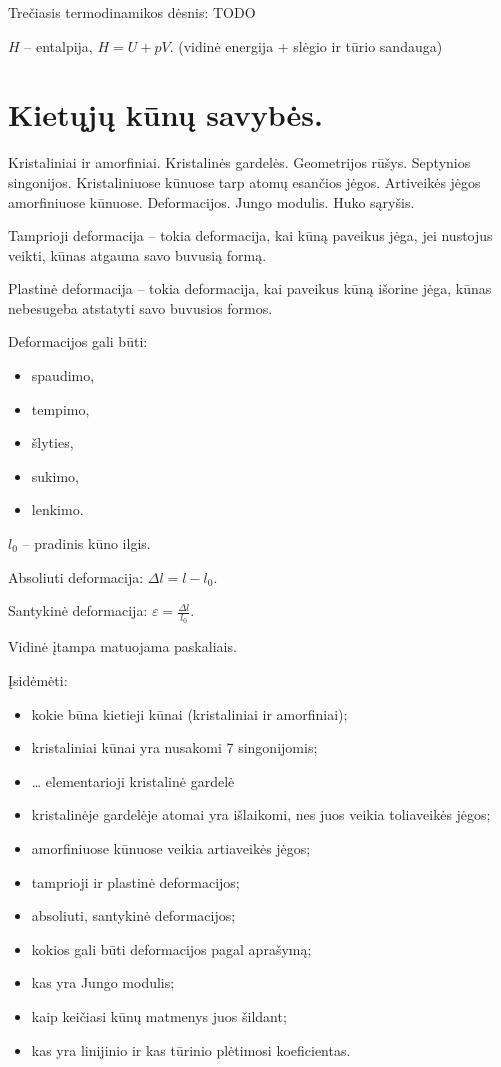 Trečiasis termodinamikos dėsnis: TODO

$H$ – entalpija, $H = U + pV$. (vidinė energija + slėgio ir tūrio sandauga)

\section{Kietųjų kūnų savybės.}

Kristaliniai ir amorfiniai. Kristalinės gardelės. Geometrijos rūšys.
Septynios singonijos. Kristaliniuose kūnuose tarp atomų esančios jėgos.
Artiveikės jėgos amorfiniuose kūnuose. Deformacijos. Jungo modulis.
Huko sąryšis.

Tamprioji deformacija – tokia deformacija, kai kūną paveikus jėga, jei
nustojus veikti, kūnas atgauna savo buvusią formą.

Plastinė deformacija – tokia deformacija, kai paveikus kūną išorine jėga,
kūnas nebesugeba atstatyti savo buvusios formos.

Deformacijos gali būti:
\begin{itemize}
  \item spaudimo,
  \item tempimo,
  \item šlyties,
  \item sukimo,
  \item lenkimo.
\end{itemize}

$l_{0}$ – pradinis kūno ilgis.

Absoliuti deformacija: $\Delta l = l - l_{0}$.

Santykinė deformacija: $\varepsilon = \frac{\Delta l}{l_{0}}$.

Vidinė įtampa matuojama paskaliais.

Įsidėmėti:
\begin{itemize}
  \item kokie būna kietieji kūnai (kristaliniai ir amorfiniai);
  \item kristaliniai kūnai yra nusakomi 7 singonijomis;
  \item … elementarioji kristalinė gardelė
  \item kristalinėje gardelėje atomai yra išlaikomi, nes juos veikia
    toliaveikės jėgos;
  \item amorfiniuose kūnuose veikia artiaveikės jėgos;
  \item tamprioji ir plastinė deformacijos;
  \item absoliuti, santykinė deformacijos;
  \item kokios gali būti deformacijos pagal aprašymą;
  \item kas yra Jungo modulis;
  \item kaip keičiasi kūnų matmenys juos šildant;
  \item kas yra linijinio ir kas tūrinio plėtimosi koeficientas.
\end{itemize}

